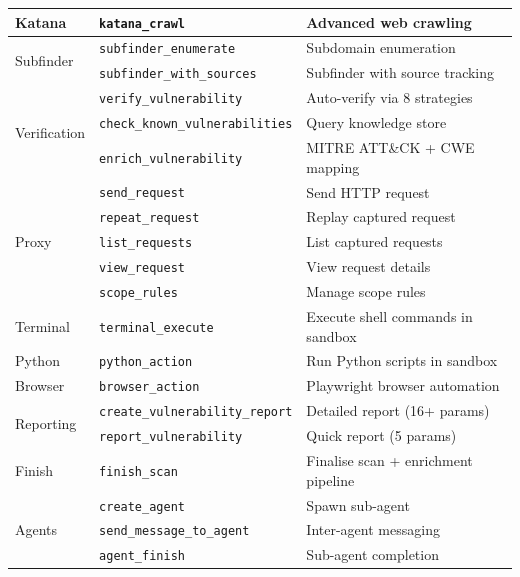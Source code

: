 \documentclass[12pt,a4paper]{report}
\begin{document}
\begin{longtable}{llp{6cm}}
\midrule
Katana      & \texttt{katana\_crawl}            & Advanced web crawling \\
\midrule
\multirow{2}{*}{Subfinder}
            & \texttt{subfinder\_enumerate}      & Subdomain enumeration \\
            & \texttt{subfinder\_with\_sources}  & Subfinder with source tracking \\
\midrule
\multirow{3}{*}{Verification}
            & \texttt{verify\_vulnerability}     & Auto-verify via 8 strategies \\
            & \texttt{check\_known\_vulnerabilities} & Query knowledge store \\
            & \texttt{enrich\_vulnerability}     & MITRE ATT\&CK + CWE mapping \\
\midrule
\multirow{5}{*}{Proxy}
            & \texttt{send\_request}            & Send HTTP request \\
            & \texttt{repeat\_request}           & Replay captured request \\
            & \texttt{list\_requests}            & List captured requests \\
            & \texttt{view\_request}             & View request details \\
            & \texttt{scope\_rules}              & Manage scope rules \\
\midrule
Terminal    & \texttt{terminal\_execute}         & Execute shell commands in sandbox \\
Python      & \texttt{python\_action}            & Run Python scripts in sandbox \\
Browser     & \texttt{browser\_action}           & Playwright browser automation \\
\midrule
\multirow{2}{*}{Reporting}
            & \texttt{create\_vulnerability\_report} & Detailed report (16+ params) \\
            & \texttt{report\_vulnerability}     & Quick report (5 params) \\
\midrule
Finish      & \texttt{finish\_scan}              & Finalise scan + enrichment pipeline \\
\midrule
\multirow{3}{*}{Agents}
            & \texttt{create\_agent}             & Spawn sub-agent \\
            & \texttt{send\_message\_to\_agent}  & Inter-agent messaging \\
            & \texttt{agent\_finish}             & Sub-agent completion \\
\end{longtable}
\end{document}
